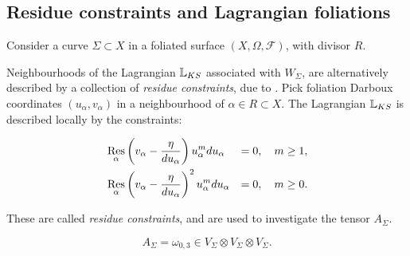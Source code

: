     
    
    
    
    
    \subsection{Residue constraints and Lagrangian foliations}
    \label{sec:rescons}
    Consider a curve \(\Sigma \subset X\) in a foliated surface \((X,\Omega,\mathcal{F})\), with divisor \(R\).

    
    Neighbourhoods of the Lagrangian \( \mathbb{L}_{KS} \) associated with \(W_\Sigma\), are alternatively described by a collection of \emph{residue constraints}, due to \cite{ks_airy}. Pick foliation Darboux coordinates \( ( u_{\alpha}, v_{\alpha})\) in a neighbourhood of \( \alpha \in R \subset X\). The Lagrangian \( \mathbb{L}_{KS }\) is described locally by the constraints:
    \begin{defn}
    \begin{alignat}{3}  
        \label{eqn:rescon1}
        &\operatorname*{Res}_\alpha\left(v_\alpha-\frac{\eta}{du_\alpha}\right)u_\alpha^mdu_\alpha &= 0,\quad m\geq 1,\\
        &\operatorname*{Res}_\alpha\left(v_\alpha-\frac{\eta}{du_\alpha}\right)^2u_\alpha^mdu_\alpha &= 0,\quad m\geq 0. \label{eqn:rescon2}
    \end{alignat} 
    \end{defn}
    These are called \emph{residue constraints}, and are used to investigate the tensor \(A_\Sigma\). 
    
    \begin{lem}   
    \[A_\Sigma=\omega_{0,3}\in V_\Sigma\otimes V_\Sigma\otimes V_\Sigma.\]
    \end{lem}
    
